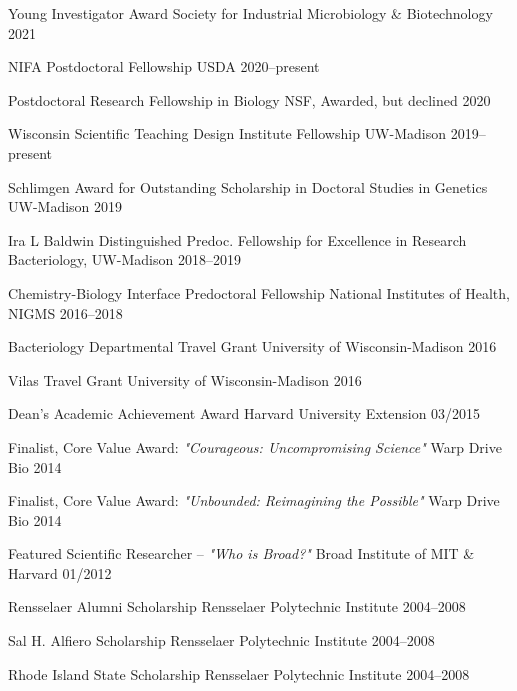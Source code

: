 

\begin{cvhonors}

\cvhonor
{Young Investigator Award}
{Society for Industrial Microbiology \& Biotechnology}
{2021}

\cvhonor
{NIFA Postdoctoral Fellowship}
{USDA}
{2020--present}

\cvhonor
{Postdoctoral Research Fellowship in Biology}
{NSF, Awarded, but declined}
{2020}
%

\cvhonor
{Wisconsin Scientific Teaching Design Institute Fellowship}
{UW-Madison}
{2019--present}

\end{cvhonors} \begin{cvhonors}

\cvhonor
{Schlimgen Award for Outstanding Scholarship in Doctoral Studies in Genetics}
{UW-Madison}
{2019}

\cvhonor
{Ira L Baldwin Distinguished Predoc. Fellowship for Excellence in Research}
{Bacteriology, UW-Madison}
{2018--2019}

\cvhonor
{Chemistry-Biology Interface Predoctoral Fellowship}
{National Institutes of Health, NIGMS}
{2016--2018}

%
%

\cvhonor
{Bacteriology Departmental Travel Grant}
{University of Wisconsin-Madison}
{2016}

\cvhonor
{Vilas Travel Grant}
{University of Wisconsin-Madison}
{2016}

\cvhonor
{Dean's Academic Achievement Award}
{Harvard University Extension}
{03/2015}

\cvhonor
{Finalist, Core Value Award: \textit{"Courageous: Uncompromising Science"}}
{Warp Drive Bio}
{2014}

\cvhonor
{Finalist, Core Value Award: \textit{"Unbounded: Reimagining the Possible"}}
{Warp Drive Bio}
{2014}

\cvhonor
{Featured Scientific Researcher -- \textit{"Who is Broad?"}}
{Broad Institute of MIT \& Harvard}
{01/2012}

\cvhonor
{Rensselaer Alumni Scholarship}
{Rensselaer Polytechnic Institute}
{2004--2008}

\cvhonor
{Sal H. Alfiero Scholarship}
{Rensselaer Polytechnic Institute}
{2004--2008}

\cvhonor
{Rhode Island State Scholarship}
{Rensselaer Polytechnic Institute}
{2004--2008}

\end{cvhonors}
